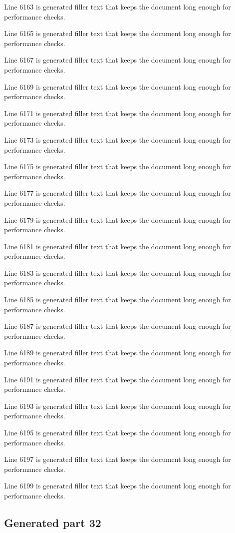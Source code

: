 Line 6163 is generated filler text that keeps the document long enough for performance checks.

Line 6165 is generated filler text that keeps the document long enough for performance checks.

Line 6167 is generated filler text that keeps the document long enough for performance checks.

Line 6169 is generated filler text that keeps the document long enough for performance checks.

Line 6171 is generated filler text that keeps the document long enough for performance checks.

Line 6173 is generated filler text that keeps the document long enough for performance checks.

Line 6175 is generated filler text that keeps the document long enough for performance checks.

Line 6177 is generated filler text that keeps the document long enough for performance checks.

Line 6179 is generated filler text that keeps the document long enough for performance checks.

Line 6181 is generated filler text that keeps the document long enough for performance checks.

Line 6183 is generated filler text that keeps the document long enough for performance checks.

Line 6185 is generated filler text that keeps the document long enough for performance checks.

Line 6187 is generated filler text that keeps the document long enough for performance checks.

Line 6189 is generated filler text that keeps the document long enough for performance checks.

Line 6191 is generated filler text that keeps the document long enough for performance checks.

Line 6193 is generated filler text that keeps the document long enough for performance checks.

Line 6195 is generated filler text that keeps the document long enough for performance checks.

Line 6197 is generated filler text that keeps the document long enough for performance checks.

Line 6199 is generated filler text that keeps the document long enough for performance checks.

\subsection{Generated part 32}

